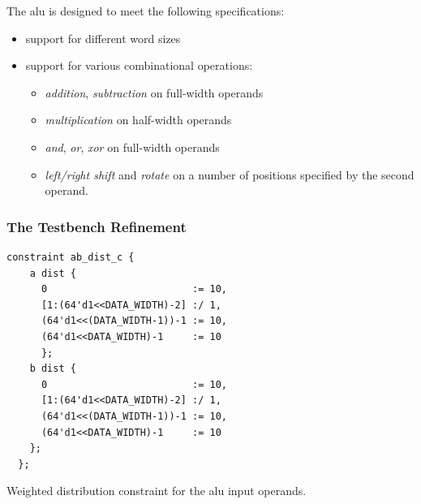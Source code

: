 \noindent The \ac{alu} is designed to meet the following specifications:
\begin{itemize}
    \item support for different word sizes
    \item support for various combinational operations:
    \begin{itemize}
        \item \emph{addition}, \emph{subtraction} on full-width operands
        \item \emph{multiplication} on half-width operands
        \item \emph{and}, \emph{or}, \emph{xor} on full-width operands
        \item \emph{left/right shift} and \emph{rotate} on a number of positions specified by the second operand.
    \end{itemize}
\end{itemize}

\subsubsection{The Testbench Refinement}

\begin{listing}
\begin{verbatim}
constraint ab_dist_c {
    a dist {
      0                         := 10,
      [1:(64'd1<<DATA_WIDTH)-2] :/ 1,
      (64'd1<<(DATA_WIDTH-1))-1 := 10,
      (64'd1<<DATA_WIDTH)-1     := 10
      };
    b dist {
      0                         := 10,
      [1:(64'd1<<DATA_WIDTH)-2] :/ 1,
      (64'd1<<(DATA_WIDTH-1))-1 := 10,
      (64'd1<<DATA_WIDTH)-1     := 10
    };
  };
\end{verbatim}
\caption{Weighted distribution constraint for the \ac{alu} input operands.}
\label{list:alu_ab_dist}
\end{listing}


